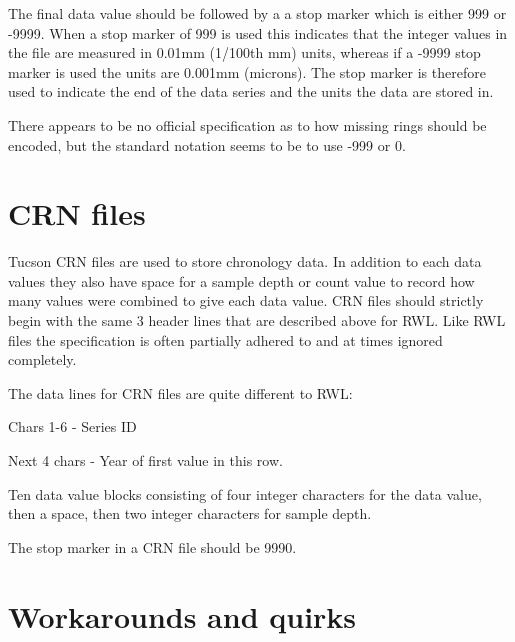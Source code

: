 The final data value should be followed by a a stop marker which is either 999 or -9999. When a stop marker of 999 is used this indicates that the integer values in the file are measured in 0.01mm (1/100th mm) units, whereas if a -9999 stop marker is used the units are 0.001mm (microns). The stop marker is therefore used to indicate the end of the data series and the units the data are stored in.

There appears to be no official specification as to how missing rings should be encoded, but the standard notation seems to be to use -999 or 0. 

\section{CRN files}

Tucson CRN files are used to store chronology data. In addition to each data values they also have space for a sample depth or count value to record how many values were combined to give each data value. CRN files should strictly begin with the same 3 header lines that are described above for RWL. Like RWL files the specification is often partially adhered to and at times ignored completely.

The data lines for CRN files are quite different to RWL:

\begin{itemize*}
    \item  Chars 1-6 - Series ID
    \item  Next 4 chars - Year of first value in this row.
    \item  Ten data value blocks consisting of four integer characters for the data value, then a space, then two integer characters for sample depth. 
\end{itemize*}

The stop marker in a CRN file should be 9990. 

\section{Workarounds and quirks}


